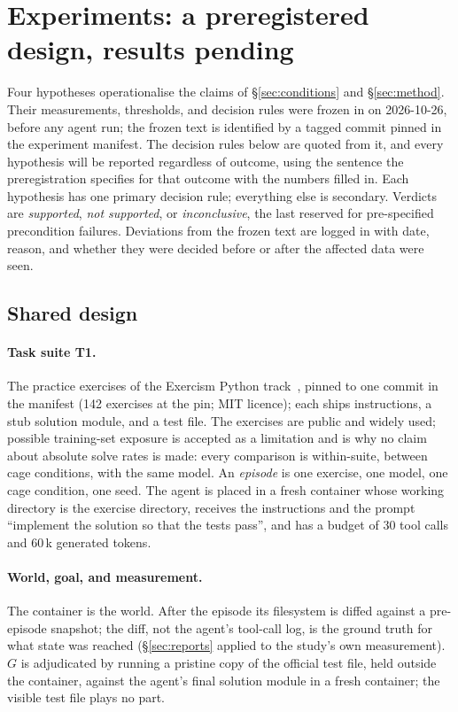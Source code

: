 \section{Experiments: a preregistered design, results pending}
\label{sec:experiments}

Four hypotheses operationalise the claims of \S\ref{sec:conditions} and \S\ref{sec:method}. Their measurements, thresholds, and decision rules were frozen in  on 2026-10-26, before any agent run; the frozen text is identified by a tagged commit pinned in the experiment manifest. The decision rules below are quoted from it, and every hypothesis will be reported regardless of outcome, using the sentence the preregistration specifies for that outcome with the numbers filled in. Each hypothesis has one primary decision rule; everything else is secondary. Verdicts are \emph{supported}, \emph{not supported}, or \emph{inconclusive}, the last reserved for pre-specified precondition failures. Deviations from the frozen text are logged in  with date, reason, and whether they were decided before or after the affected data were seen.

\subsection{Shared design}
\label{sec:shared}

\paragraph{Task suite T1.}
The practice exercises of the Exercism Python track~\citep{exercism-python}, pinned to one commit in the manifest (142 exercises at the pin; MIT licence); each ships instructions, a stub solution module, and a test file. The exercises are public and widely used; possible training-set exposure is accepted as a limitation and is why no claim about absolute solve rates is made: every comparison is within-suite, between cage conditions, with the same model. An \emph{episode} is one exercise, one model, one cage condition, one seed. The agent is placed in a fresh container whose working directory is the exercise directory, receives the instructions and the prompt ``implement the solution so that the tests pass'', and has a budget of 30 tool calls and 60\,k generated tokens.

\paragraph{World, goal, and measurement.}
The container is the world. After the episode its filesystem is diffed against a pre-episode snapshot; the diff, not the agent's tool-call log, is the ground truth for what state was reached (\S\ref{sec:reports} applied to the study's own measurement). $G$ is adjudicated by running a pristine copy of the official test file, held outside the container, against the agent's final solution module in a fresh container; the visible test file plays no part.

